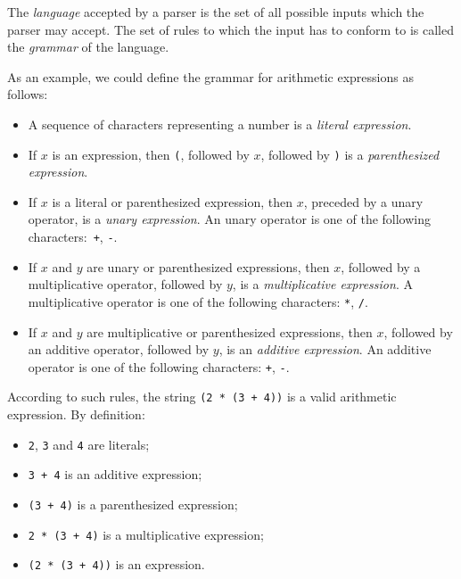 \documentclass[11pt, american, draft]{PhdThesis}
\begin{document}
  The \emph{language} accepted by a parser is the set of all possible inputs which the parser may
  accept. The set of rules to which the input has to conform to is called the \emph{grammar} of the
  language.

  As an example, we could define the grammar for arithmetic expressions as follows:

  \begin{itemize}[noitemsep,topsep=0pt]
    \item A sequence of characters representing a number is a \emph{literal expression}.

    \item If $x$ is an expression, then \texttt{(}, followed by $x$, followed by \texttt{)} is a
          \emph{parenthesized expression}.

    \item If $x$ is a literal or parenthesized expression, then $x$, preceded by a unary operator,
          is a \emph{unary expression}. An unary operator is one of the following
          characters:~\texttt{+}, \texttt{-}.

    \item If $x$ and $y$ are unary or parenthesized expressions, then $x$, followed by a
          multiplicative operator, followed by $y$, is a \emph{multiplicative expression}. A
          multiplicative operator is one of the following characters: \texttt{*}, \texttt{/}.

    \item If $x$ and $y$ are multiplicative or parenthesized expressions, then $x$, followed by an
          additive operator, followed by $y$, is an \emph{additive expression}. An additive operator
          is one of the following characters: \texttt{+}, \texttt{-}.
  \end{itemize}

  \newpage

  According to such rules, the string \texttt{(2 * (3 + 4))} is a valid arithmetic expression. By
  definition:

  \begin{itemize}[noitemsep,topsep=0pt]
    \item \texttt{2}, \texttt{3} and \texttt{4} are literals;
    \item \texttt{3 + 4} is an additive expression;
    \item \texttt{(3 + 4)} is a parenthesized expression;
    \item \texttt{2 * (3 + 4)} is a multiplicative expression;
    \item \texttt{(2 * (3 + 4))} is an expression.
  \end{itemize}
\end{document}
